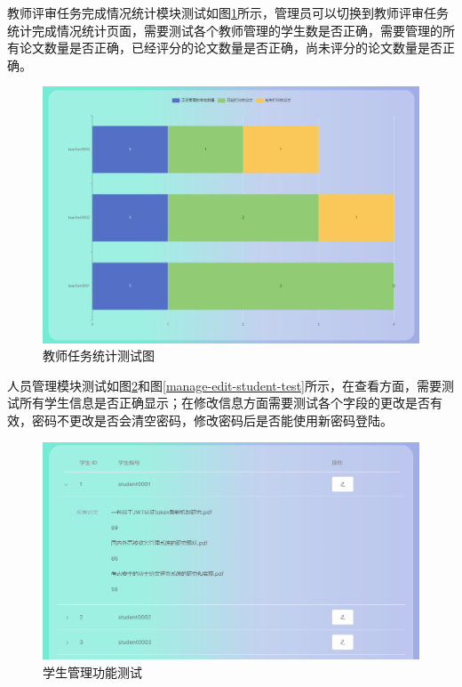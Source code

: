教师评审任务完成情况统计模块测试如图\ref{statistic-teacher-task-test}所示，管理员可以切换到教师评审任务统计完成情况统计页面，需要测试各个教师管理的学生数是否正确，需要管理的所有论文数量是否正确，已经评分的论文数量是否正确，尚未评分的论文数量是否正确。

\begin{figure}[htbp]
  \centering
  \includegraphics[scale = 0.48]{out/figure/测试/statistic-teacher-task-test.png}
  \caption{\song\wuhao 教师任务统计测试图}
  \label{statistic-teacher-task-test}
\end{figure}

人员管理模块测试如图\ref{manage-students}和图\ref{manage-edit-student-test}所示，在查看方面，需要测试所有学生信息是否正确显示；在修改信息方面需要测试各个字段的更改是否有效，密码不更改是否会清空密码，修改密码后是否能使用新密码登陆。

\begin{figure}
  \centering
  \includegraphics[scale = 0.6]{out/figure/测试/manage-students.png}
  \caption{\song\wuhao 学生管理功能测试}
  \label{manage-students}
\end{figure}

